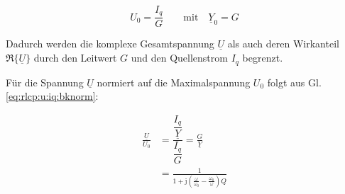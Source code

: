 \begin{frame}
{    \begin{equation}
        U_0 = \frac{I_q}{G} \qquad \text{mit} \quad \underline{Y}_0 = G
    \end{equation}

    Dadurch werden die komplexe Gesamtspannung $\underline{U}$ als auch deren Wirkanteil $\Re\{\underline{U}\}$ 
    durch den Leitwert $G$ und den Quellenstrom $I_q$ begrenzt.

    Für die Spannung $\underline{U}$ normiert auf die Maximalspannung $U_0$ folgt aus Gl. \ref{eq:rlcp:u:iq:bknorm}:

    \begin{equation}\label{eq:rlcp:unorm}
        \begin{aligned}
            \frac{\underline{U}}{U_0} 
            &= \dfrac{\dfrac{I_q}{\underline{Y}}}{\dfrac{I_q}{G}} 
            =  \frac{G}{\underline{Y}}\\
            &= \frac{1}{1 + \mathrm{j} \left(\frac{\omega}{\omega_0} - \frac{\omega_0}{\omega}\right) Q}
        \end{aligned}
    \end{equation}

}
\end{frame}
